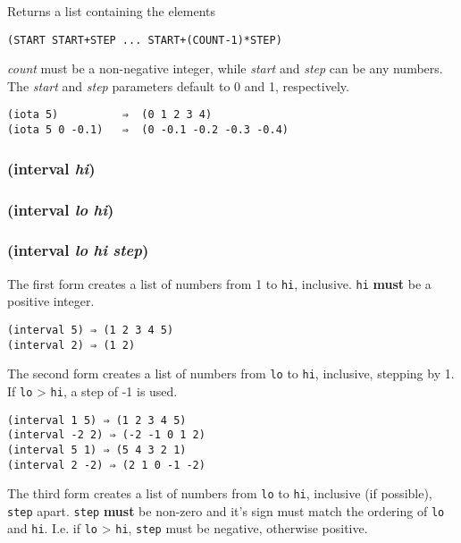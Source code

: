 \documentclass{article}
\begin{document}
Returns a list containing the elements

\begin{verbatim}
(START START+STEP ... START+(COUNT-1)*STEP)
\end{verbatim}

\emph{count} must be a non-negative integer, while \emph{start} and \emph{step} can be any
numbers. The \emph{start} and \emph{step} parameters default to 0 and 1, respectively.

\begin{verbatim}
(iota 5)          ⇒  (0 1 2 3 4)
(iota 5 0 -0.1)   ⇒  (0 -0.1 -0.2 -0.3 -0.4)
\end{verbatim}

\subsubsection{(interval \emph{hi})}

\subsubsection{(interval \emph{lo} \emph{hi})}

\subsubsection{(interval \emph{lo} \emph{hi} \emph{step})}

The first form creates a list of numbers from 1 to \verb|hi|, inclusive. \verb|hi|
\textbf{must} be a positive integer.

\begin{verbatim}
(interval 5) ⇒ (1 2 3 4 5)
(interval 2) ⇒ (1 2)
\end{verbatim}

The second form creates a list of numbers from \verb|lo| to \verb|hi|, inclusive, stepping
by 1. If \verb|lo| \textgreater{} \verb|hi|, a step of -1 is used.

\begin{verbatim}
(interval 1 5) ⇒ (1 2 3 4 5)
(interval -2 2) ⇒ (-2 -1 0 1 2)
(interval 5 1) ⇒ (5 4 3 2 1)
(interval 2 -2) ⇒ (2 1 0 -1 -2)
\end{verbatim}

The third form creates a list of numbers from \verb|lo| to \verb|hi|, inclusive (if
possible), \verb|step| apart. \verb|step| \textbf{must} be non-zero and it's sign must
match the ordering of \verb|lo| and \verb|hi|. I.e. if \verb|lo| \textgreater{}
\verb|hi|, \verb|step| must be negative, otherwise positive.
\end{document}
